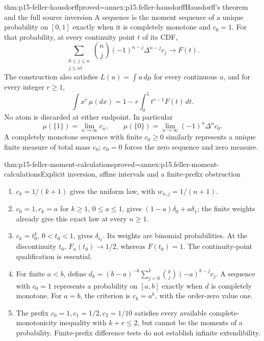 \begin{hbtheorem}{thm:p15-feller-hausdorff}{proved=annex:p15.feller-hausdorff}{Hausdorff's theorem and the full source inversion}
A sequence is the moment sequence of a unique probability on \([0,1]\)
exactly when it is completely monotone and \(c_0=1\).
For that probability, at every continuity point \(t\) of its CDF,
\[
                       \sum_{\substack{0\leq j\leq n\\j\leq nt}}
                            \binom nj(-1)^{n-j}\Delta^{n-j}c_j
                                  \longrightarrow F(t).
\]
The construction also satisfies \(L(u)=\int u\,d\mu\) for every
continuous \(u\), and for every integer \(r\geq1\),
\[
                \int x^r\,\mu(dx)
                    =1-r\int_0^1 t^{r-1}F(t)\,dt.
\]
No atom is discarded at either endpoint.
In particular
\[
 \mu(\{1\})=\lim_{n\to\infty}c_n,\qquad
 \mu(\{0\})=\lim_{n\to\infty}(-1)^n\Delta^nc_0.
\]
A completely monotone sequence with finite \(c_0\geq0\) similarly
represents a unique finite measure of total mass \(c_0\);
\(c_0=0\) forces the zero sequence and zero measure.
\end{hbtheorem}

\begin{hbtheorem}{thm:p15-feller-moment-calculations}{proved=annex:p15.feller-moment-calculations}{Explicit inversion, affine intervals and a finite-prefix obstruction}
\begin{enumerate}
\item \(c_k=1/(k+1)\) gives the uniform law, with
      \(w_{n,j}=1/(n+1)\).
\item \(c_0=1,c_k=a\) for \(k\geq1\), \(0\leq a\leq1\),
      gives \((1-a)\delta_0+a\delta_1\); the finite weights already
      give this exact law at every \(n\geq1\).
\item \(c_k=t_0^k\), \(0<t_0<1\), gives \(\delta_{t_0}\).
      Its weights are binomial probabilities. At the discontinuity
      \(t_0\), \(F_n(t_0)\to1/2\), whereas \(F(t_0)=1\).
      The continuity-point qualification is essential.
\item For finite \(a<b\), define
      \(d_k=(b-a)^{-k}\sum_{j=0}^k\binom kj(-a)^{k-j}c_j\).
      A sequence with \(c_0=1\) represents a probability on \([a,b]\)
      exactly when \(d\) is completely monotone.
      For \(a=b\), the criterion is \(c_k=a^k\), with the order-zero
      value one.
\item The prefix \(c_0=1,c_1=1/2,c_2=1/10\) satisfies every
      available complete-monotonicity inequality with \(k+r\leq2\),
      but cannot be the moments of a probability.
      Finite-prefix difference tests do not establish infinite extendibility.
\end{enumerate}
\end{hbtheorem}

